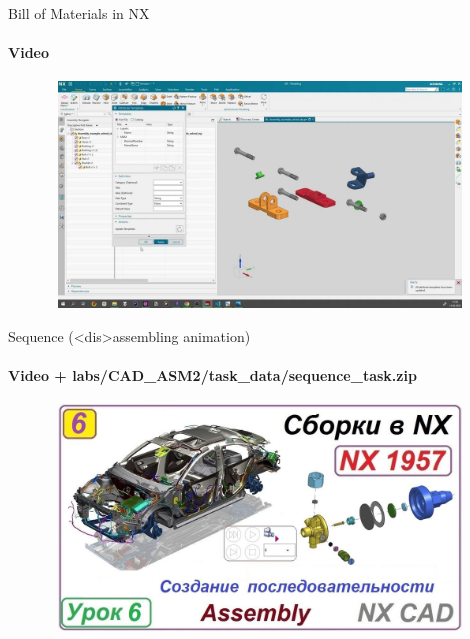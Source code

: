 \documentclass[aspectratio=169]{beamer}
\newcommand{\fbckg}[1]{\usebackgroundtemplate{\texttt{[image: \#1]}}}%
\begin{document}
\begin{frame}[t]{Bill of Materials in NX}
    \framesubtitle{Video}
    \vspace{-0.6cm}
    \begin{figure}[H]
        \href{https://disk.yandex.ru/i/xTmHh9jwxI5GPw}{
            \centering\includegraphics[height=6cm,width=1\textwidth,keepaspectratio]{bom_preview.png}}
        \label{fig:bom_preview.png}
    \end{figure}
\end{frame}

\begin{frame}[t]{Sequence (<dis>assembling animation)}
    \framesubtitle{Video + labs/CAD\_ASM2/task\_data/sequence\_task.zip}
    \vspace{-0.6cm}
    \begin{figure}[H]
        \href{https://disk.yandex.ru/i/fDUp5zSG3iDofA}{
            \centering\includegraphics[height=6cm,width=1\textwidth,keepaspectratio]{sequence_preview.jpg}}
        \label{fig:sequence_preview.jpg}
    \end{figure}
\end{frame}

\fbckg{fibeamer/figs/last_page.png}
\frame[plain]{}
\end{document}
